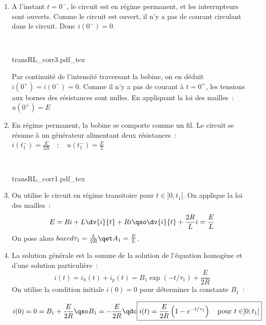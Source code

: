 \documentclass[a4paper, 10pt, garamond, oneside]{book}
\begin{document}
{}{
	\begin{enumerate}
		\item \noindent
		      \begin{minipage}[t]{.49\linewidth}
			      A l'instant $t=0^-$, le circuit est en régime permanent, et les interrupteurs sont ouverts. Comme le circuit est ouvert, il n'y a pas de courant circulant dans le circuit. Donc $\boxed{i(0^-)=0}$.
		      \end{minipage}
		      \hfill
		      \begin{minipage}[t]{.49\linewidth}
			      ~
			      \begin{center}
				      {transRL_corr3.pdf_tex}
			      \end{center}
		      \end{minipage}
		      Par continuité de l'intensité traversant la bobine, on en déduit
		      $\boxed{i(0^+)=i(0^-)=0}$.
		      Comme il n'y a pas de courant à $t=0^+$, les tensions aux bornes des
		      résistances sont nulles. En appliquant la loi des mailles~:
		      $\boxed{u(0^+)=E}$
		\item
		      \noindent
		      \begin{minipage}[t]{.49\linewidth}
			      En régime permanent, la bobine se comporte comme un fil. Le circuit se résume à un générateur alimentant deux résistances~: $\boxed{i(t_1^-)=\frac{E}{2R}\quad ;\quad u(t_1^-)=\frac{E}{2}}$
		      \end{minipage}
		      \hfill
		      \begin{minipage}[t]{.49\linewidth}
			      ~
			      \begin{center}
				      {transRL_corr1.pdf_tex}
			      \end{center}
		      \end{minipage}
		\item
		      On utilise le circuit en régime transitoire pour $t\in]0,t_1[$. On applique la loi des mailles~:
		      \[
			      E=Ri+L\dv{i}{t}+Ri
			      \qso
			      \dv{i}{t}+\frac{2R}{L}i=\frac{E}{L}
		      \]
		      On pose alors $boxed{\tau_1=\frac{L}{2R}\qet A_1=\frac{E}{L}}$.
		\item La solution générale est la somme de la solution de l'équation
      homogène et d'une solution particulière~:
		      \[
			      i(t)=i_h(t)+i_p(t)=B_1\exp(-t/\tau_1)+\frac{E}{2R}
		      \]
		      On utilise la condition initiale $i(0)=0$ pour déterminer la constante
          $B_1$~:

		      \[
			      i(0)=0=B_1+\frac{E}{2R}
			      \qso
			      B_1=-\frac{E}{2R}\qdc
			      \boxed{i(t)= \frac{E}{2R}\left (1-e^{-t/\tau_1}  \right )\quad\mbox{pour } t\in]0;t_1[}
		      \]


\end{enumerate}}
\end{document}
